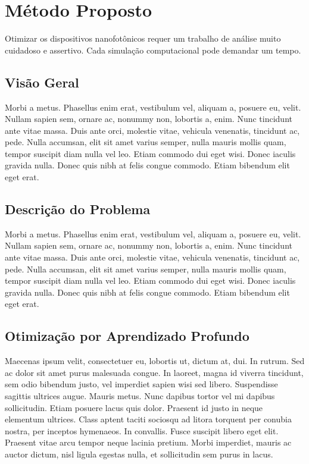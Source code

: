 \chapter{Método Proposto}      \label{Metodo Proposto}

Otimizar os dispositivos nanofotônicos requer um trabalho de análise muito cuidadoso e assertivo. Cada simulação computacional pode demandar um tempo.

\section{Visão Geral}

Morbi a metus. Phasellus enim erat, vestibulum vel, aliquam a, posuere eu, velit. Nullam sapien sem, ornare ac, nonummy non, lobortis a, enim. Nunc tincidunt ante vitae massa. Duis ante orci, molestie vitae, vehicula venenatis, tincidunt ac, pede. Nulla accumsan, elit sit amet varius semper, nulla mauris mollis quam, tempor suscipit diam nulla vel leo. Etiam commodo dui eget wisi. Donec iaculis gravida nulla. Donec quis nibh at felis congue commodo. Etiam bibendum elit eget erat.


\section{Descrição do Problema}

Morbi a metus. Phasellus enim erat, vestibulum vel, aliquam a, posuere eu, velit. Nullam sapien sem, ornare ac, nonummy non, lobortis a, enim. Nunc tincidunt ante vitae massa. Duis ante orci, molestie vitae, vehicula venenatis, tincidunt ac, pede. Nulla accumsan, elit sit amet varius semper, nulla mauris mollis quam, tempor suscipit diam nulla vel leo. Etiam commodo dui eget wisi. Donec iaculis gravida nulla. Donec quis nibh at felis congue commodo. Etiam bibendum elit eget erat.




\section{Otimização por Aprendizado Profundo}

Maecenas ipsum velit, consectetuer eu, lobortis ut, dictum at, dui. In rutrum. Sed ac dolor sit amet purus malesuada congue. In laoreet, magna id viverra tincidunt, sem odio bibendum justo, vel imperdiet sapien wisi sed libero. Suspendisse sagittis ultrices augue. Mauris metus. Nunc dapibus tortor vel mi dapibus sollicitudin. Etiam posuere lacus quis dolor. Praesent id justo in neque elementum ultrices. Class aptent taciti sociosqu ad litora torquent per conubia nostra, per inceptos hymenaeos. In convallis. Fusce suscipit libero eget elit. Praesent vitae arcu tempor neque lacinia pretium. Morbi imperdiet, mauris ac auctor dictum, nisl ligula egestas nulla, et sollicitudin sem purus in lacus.

